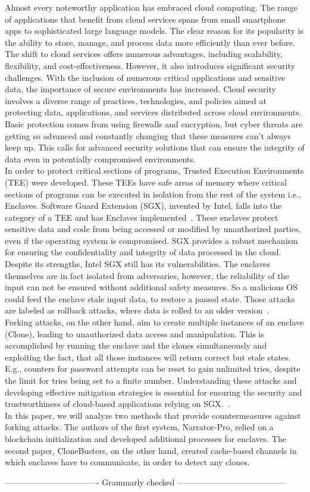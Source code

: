 
Almost every noteworthy application has embraced cloud computing. The range of applications that benefit from cloud services spans from small smartphone apps to sophisticated large language models. The clear reason for its popularity is the ability to store, manage, and process data more efficiently than ever before. The shift to cloud services offers numerous advantages, including scalability, flexibility, and cost-effectiveness. However, it also introduces significant security challenges. With the inclusion of numerous critical applications and sensitive data, the importance of secure environments has increased. Cloud security involves a diverse range of practices, technologies, and policies aimed at protecting data, applications, and services distributed across cloud environments. Basic protection comes from using firewalls and encryption, but cyber threats are getting so advanced and constantly changing that these measures can't always keep up. This calls for advanced security solutions that can ensure the integrity of data even in potentially compromised environments.\\

In order to protect critical sections of programs, Trusted Execution Environments (TEE) were developed. These TEEs have safe areas of memory where critical sections of programs can be executed in isolation from the rest of the system i.e., Enclaves. Software Guard Extension (SGX), invented by Intel, falls into the category of a TEE and has Enclaves implemented~\cite{SGX}. These enclaves protect sensitive data and code from being accessed or modified by unauthorized parties, even if the operating system is compromised. SGX provides a robust mechanism for ensuring the confidentiality and integrity of data processed in the cloud. Despite its strengths, Intel SGX still has its vulnerabilities. The enclaves themselves are in fact isolated from adversaries, however, the reliability of the input can not be ensured without additional safety measures. So a malicious OS could feed the enclave stale input data, to restore a passed state. Those attacks are labeled as rollback attacks, where data is rolled to an older version~\cite{esccc}. \\
Forking attacks, on the other hand, aim to create multiple instances of an enclave (Clone), leading to unauthorized data access and manipulation. This is accomplished by running the enclave and the clones simultaneously and exploiting the fact, that all those instances will return correct but stale states. E.g., counters for password attempts can be reset to gain unlimited tries, despite the limit for tries being set to a finite number. Understanding these attacks and developing effective mitigation strategies is essential for ensuring the security and trustworthiness of cloud-based applications relying on SGX.~\cite{nfw}.\\
In this paper, we will analyze two methods that provide countermeasures against forking attacks. The authors of the first system, Narrator-Pro, relied on a blockchain initialization and developed additional processes for enclaves. The second paper, CloneBusters, on the other hand, created cache-based channels in which enclaves have to communicate, in order to detect any clones.

---------------------------------- Grammarly checked ---------------------------------------